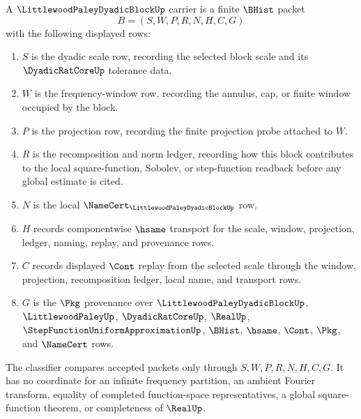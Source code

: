 \begin{definition}
\label{def:littlewood-paley-dyadic-block-carrier}
A $\LittlewoodPaleyDyadicBlockUp$ carrier is a finite $\BHist$ packet
$$
B=(S,W,P,R,N,H,C,G)
$$
with the following displayed rows:
\begin{enumerate}
\item $S$ is the dyadic scale row, recording the selected block scale and its $\DyadicRatCoreUp$ tolerance data.
\item $W$ is the frequency-window row, recording the annulus, cap, or finite window occupied by the block.
\item $P$ is the projection row, recording the finite projection probe attached to $W$.
\item $R$ is the recomposition and norm ledger, recording how this block contributes to the local square-function, Sobolev, or step-function readback before any global estimate is cited.
\item $N$ is the local $\NameCert_{\LittlewoodPaleyDyadicBlockUp}$ row.
\item $H$ records componentwise $\hsame$ transport for the scale, window, projection, ledger, naming, replay, and provenance rows.
\item $C$ records displayed $\Cont$ replay from the selected scale through the window, projection, recomposition ledger, local name, and transport rows.
\item $G$ is the $\Pkg$ provenance over $\LittlewoodPaleyDyadicBlockUp$, $\LittlewoodPaleyUp$, $\DyadicRatCoreUp$, $\RealUp$, $\StepFunctionUniformApproximationUp$, $\BHist$, $\hsame$, $\Cont$, $\Pkg$, and $\NameCert$ rows.
\end{enumerate}
The classifier compares accepted packets only through $S,W,P,R,N,H,C,G$. It has no coordinate for an infinite frequency partition, an ambient Fourier transform, equality of completed function-space representatives, a global square-function theorem, or completeness of $\RealUp$.
\end{definition}

